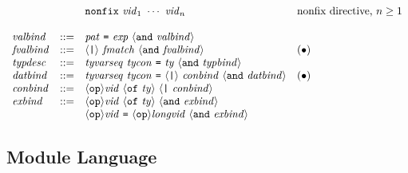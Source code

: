 \documentclass[twoside,titlepage]{article}
\begin{document}
\begin{appendix}
$$\begin{array}{llll}
  && {\tt{nonfix}}~\mathit{vid}_1~\cdots~\mathit{vid}_n & \textrm{nonfix directive, $n\geq1$} \\
  \\
  \mathit{valbind} & ::= & \mathit{pat}~\mbox{\tt=}~\mathit{exp}~\langle{\tt{and}}~\mathit{valbind}\rangle \\
  \mathit{fvalbind} &::=& \langle\mbox{\tt|}\rangle~\mathit{fmatch}~\langle{\tt{and}}~\mathit{fvalbind}\rangle & \textrm{$(\bullet)$} \\
  \mathit{typdesc} & ::= & \mathit{tyvarseq}~\mathit{tycon}~\mbox{\tt=}~\mathit{ty}~\langle{\tt{and}}~\mathit{typbind}\rangle \\
  \mathit{datbind} & ::= & \mathit{tyvarseq}~\mathit{tycon}~\mbox{\tt=}~\langle\mbox{\tt|}\rangle~\mathit{conbind}~\langle{\tt{and}}~\mathit{datbind}\rangle & \textrm{$(\bullet)$} \\
  \mathit{conbind} & ::= & \langle{\tt{op}}\rangle\mathit{vid}~\langle{\tt{of}}~\mathit{ty}\rangle~\langle\mbox{\tt|}~\mathit{conbind}\rangle \\
  \mathit{exbind} & ::= & \langle{\tt{op}}\rangle\mathit{vid}~\langle{\tt{of}}~\mathit{ty}\rangle~\langle{\tt{and}}~\mathit{exbind}\rangle \\
  && \langle{\tt{op}}\rangle\mathit{vid}~\mbox{\tt=}~\langle{\tt{op}}\rangle\mathit{longvid}~\langle{\tt{and}}~\mathit{exbind}\rangle \\
  \end{array}
  $$


\subsection{Module Language}
\label{modulegrammar}


\end{appendix}
\end{document}
